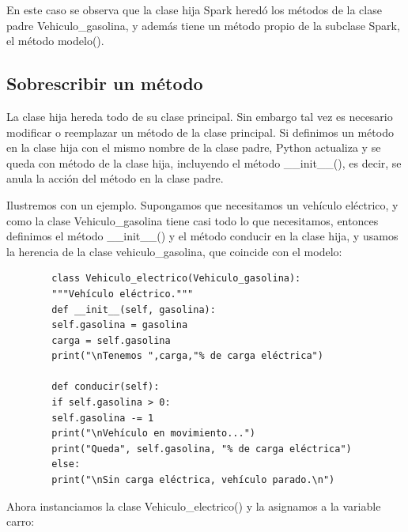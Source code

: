 {{	En este caso se observa que la clase hija {\ttfamily Spark} heredó los métodos de la clase padre {\ttfamily Vehiculo\_gasolina}, y además tiene un método propio de la subclase {\ttfamily Spark}, el método {\ttfamily modelo()}.
	
	\subsection{Sobrescribir un método}
	
	
	
	La clase hija hereda todo de su clase principal. Sin embargo tal vez es necesario modificar o reemplazar un método de la clase principal.  Si definimos un método en la clase hija con el mismo nombre de la clase padre, Python actualiza y se queda con método de la clase hija, incluyendo el método {\ttfamily\_\!\_init\_\!\_()}, es decir, se anula la acción del método en la clase padre. 
	
	Ilustremos con un ejemplo. Supongamos que necesitamos un vehículo eléctrico, y como la clase {\ttfamily Vehiculo\_gasolina} tiene casi todo lo que necesitamos, entonces  definimos el método {\ttfamily\_\!\_init\_\!\_()} y el método {\ttfamily conducir} en la clase hija, y usamos la herencia de la clase {\ttfamily vehiculo\_gasolina}, que coincide con el modelo:
	
	\hspace{-2.7cm}{\ttfamily \scriptsize electrico.py}  \vspace{-0.5cm}
	\begin{lstlisting}
		class Vehiculo_electrico(Vehiculo_gasolina):
		"""Vehículo eléctrico."""
		def __init__(self, gasolina):
		self.gasolina = gasolina
		carga = self.gasolina
		print("\nTenemos ",carga,"% de carga eléctrica")
		
		def conducir(self):
		if self.gasolina > 0:
		self.gasolina -= 1
		print("\nVehículo en movimiento...")
		print("Queda", self.gasolina, "% de carga eléctrica")	
		else:
		print("\nSin carga eléctrica, vehículo parado.\n")
	\end{lstlisting}
	
	Ahora instanciamos la clase {\ttfamily Vehiculo\_electrico()} y la asignamos a la variable carro:
	
}}
